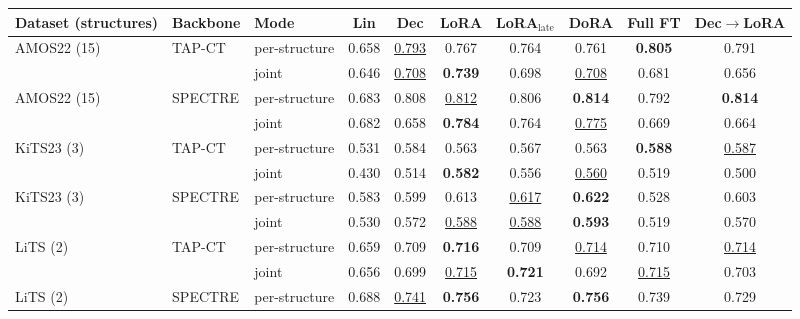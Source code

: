 \begin{tabular}{lllccccccc}
\toprule
Dataset (structures) & Backbone & Mode & Lin & Dec & LoRA & LoRA$_{\text{late}}$ & DoRA & Full FT & Dec$\to$LoRA \\
\midrule
AMOS22 (15) & TAP-CT & per-structure & \cellcolor{modebest}0.658 & \cellcolor{modebest}\underline{0.793} & \cellcolor{modebest}0.767 & \cellcolor{modebest}0.764 & \cellcolor{modebest}0.761 & \cellcolor{modebest}\textbf{0.805} & \cellcolor{modebest}0.791 \\
 &  & joint & 0.646 & \underline{0.708} & \textbf{0.739} & 0.698 & \underline{0.708} & 0.681 & 0.656 \\
\addlinespace[2pt]
AMOS22 (15) & SPECTRE & per-structure & \cellcolor{modebest}0.683 & \cellcolor{modebest}0.808 & \cellcolor{modebest}\underline{0.812} & \cellcolor{modebest}0.806 & \cellcolor{modebest}\textbf{0.814} & \cellcolor{modebest}0.792 & \cellcolor{modebest}\textbf{0.814} \\
 &  & joint & 0.682 & 0.658 & \textbf{0.784} & 0.764 & \underline{0.775} & 0.669 & 0.664 \\
\addlinespace[2pt]
KiTS23 (3) & TAP-CT & per-structure & \cellcolor{modebest}0.531 & \cellcolor{modebest}0.584 & 0.563 & \cellcolor{modebest}0.567 & \cellcolor{modebest}0.563 & \cellcolor{modebest}\textbf{0.588} & \cellcolor{modebest}\underline{0.587} \\
 &  & joint & 0.430 & 0.514 & \cellcolor{modebest}\textbf{0.582} & 0.556 & \underline{0.560} & 0.519 & 0.500 \\
\addlinespace[2pt]
KiTS23 (3) & SPECTRE & per-structure & \cellcolor{modebest}0.583 & \cellcolor{modebest}0.599 & \cellcolor{modebest}0.613 & \cellcolor{modebest}\underline{0.617} & \cellcolor{modebest}\textbf{0.622} & \cellcolor{modebest}0.528 & \cellcolor{modebest}0.603 \\
 &  & joint & 0.530 & 0.572 & \underline{0.588} & \underline{0.588} & \textbf{0.593} & 0.519 & 0.570 \\
\addlinespace[2pt]
LiTS (2) & TAP-CT & per-structure & \cellcolor{modebest}0.659 & \cellcolor{modebest}0.709 & \cellcolor{modebest}\textbf{0.716} & 0.709 & \cellcolor{modebest}\underline{0.714} & 0.710 & \cellcolor{modebest}\underline{0.714} \\
 &  & joint & 0.656 & 0.699 & \underline{0.715} & \cellcolor{modebest}\textbf{0.721} & 0.692 & \cellcolor{modebest}\underline{0.715} & 0.703 \\
\addlinespace[2pt]
LiTS (2) & SPECTRE & per-structure & 0.688 & \underline{0.741} & \cellcolor{modebest}\textbf{0.756} & 0.723 & \cellcolor{modebest}\textbf{0.756} & \cellcolor{modebest}0.739 & 0.729 \\

\end{tabular}

